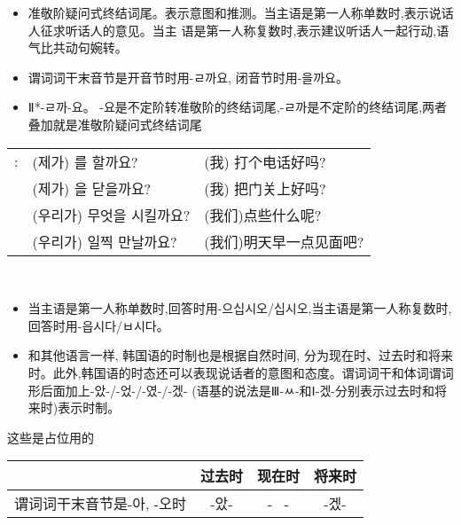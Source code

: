 \begin{grammar}
	\begin{grammarsect}[ \kr -(으)ㄹ까요]
		\begin{itemize}
			\item 准敬阶疑问式终结词尾。表示意图和推测。当主语是第一人称单数时,表示说话人征求听话人的意见。当主 语是第一人称复数时,表示建议听话人一起行动,语气比共动句婉转。
			\item 谓词词干末音节是开音节时用{\kr -ㄹ까요}, 闭音节时用{\kr -을까요}。
			\item {\color{gray} {\kr Ⅱ*-ㄹ까-요。 -요}是不定阶转准敬阶的终结词尾,{\kr -ㄹ까}是不定阶的终结词尾,两者叠加就是准敬阶疑问式终结词尾}
		\end{itemize}
		\begin{tabular}{lll}
			\kr \ruby{例}{예}: &\kr  (제가) \ruby{電話}{전화}를 할까요?     & (我) 打个电话好吗?   \\
			             &\kr  (제가) \ruby{門}{문}을 닫을까요?      & (我) 把门关上好吗?   \\
			             &\kr  (우리가) 무엇을 시킬까요?              & (我们)点些什么呢?    \\
			             &\kr  (우리가) \ruby{來日}{내일} 일찍 만날까요? & (我们)明天早一点见面吧? \\
		\end{tabular}\\
		\begin{itemize}
			\item 当主语是第一人称单数时,回答时用{\kr -으십시오/십시오},当主语是第一人称复数时,回答时用{\kr -읍시다/ㅂ시다}。
		\end{itemize}
	\end{grammarsect}
	\begin{grammarsect}[时制]
		\begin{itemize}
			\item 和其他语言一样, 韩国语的时制也是根据自然时间, 分为现在时、过去时和将来时。此外,韩国语的时态还可以表现说话者的意图和态度。谓词词干和体词谓词形后面加上{\kr -았-/-었-/-였-/-겠-}{\color{gray} (语基的说法是{\kr Ⅲ-ㅆ-}和{\kr Ⅰ-겠-}分别表示过去时和将来时)}表示时制。
		\end{itemize}{\color{white} 这些是占位用的}
		\begin{tabular}{|l|c|c|c|}
			\hline
			\diagbox{用法{\color{white} 啊啊啊啊啊啊}}{时制} & 过去时 & 现在时                   & 将来时                  \\\hline
			谓词词干末音节是{\kr -아, -오}时                        &\kr  -았- & \multirow{3}{*}{- \ -} & \multirow{3}{*}{\kr -겠-} \\\cline{1-2}

\end{tabular}
\end{grammarsect}
\end{grammar}
